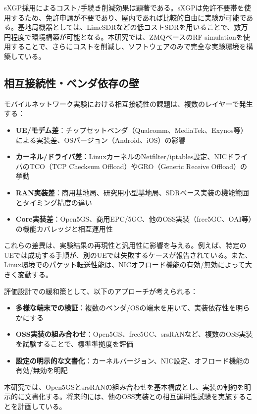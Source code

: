 sXGP採用によるコスト/手続き削減効果は顕著である。sXGPは免許不要帯を使用するため、免許申請が不要であり、屋内であれば比較的自由に実験が可能である。基地局機器としては、LimeSDRなどの低コストSDRを用いることで、数万円程度で環境構築が可能となる。本研究では、ZMQベースのRF simulationを使用することで、さらにコストを削減し、ソフトウェアのみで完全な実験環境を構築している。

\subsection{相互接続性・ベンダ依存の壁}

モバイルネットワーク実験における相互接続性の課題は、複数のレイヤーで発生する：

\begin{itemize}
\item \textbf{UE/モデム差}：チップセットベンダ（Qualcomm、MediaTek、Exynos等）による実装差、OSバージョン（Android、iOS）の影響
\item \textbf{カーネル/ドライバ差}：LinuxカーネルのNetfilter/iptables設定、NICドライバのTCO（TCP Checksum Offload）やGRO（Generic Receive Offload）の挙動
\item \textbf{RAN実装差}：商用基地局、研究用小型基地局、SDRベース実装の機能範囲とタイミング精度の違い
\item \textbf{Core実装差}：Open5GS、商用EPC/5GC、他のOSS実装（free5GC、OAI等）の機能カバレッジと相互運用性
\end{itemize}

これらの差異は、実験結果の再現性と汎用性に影響を与える。例えば、特定のUEでは成功する手順が、別のUEでは失敗するケースが報告されている。また、Linux環境でのパケット転送性能は、NICオフロード機能の有効/無効によって大きく変動する。

評価設計での緩和策として、以下のアプローチが考えられる：

\begin{itemize}
\item \textbf{多様な端末での検証}：複数のベンダ/OSの端末を用いて、実装依存性を明らかにする
\item \textbf{OSS実装の組み合わせ}：Open5GS、free5GC、srsRANなど、複数のOSS実装を試験することで、標準準拠度を評価
\item \textbf{設定の明示的な文書化}：カーネルバージョン、NIC設定、オフロード機能の有効/無効を明記
\end{itemize}

本研究では、Open5GSとsrsRANの組み合わせを基本構成とし、実装の制約を明示的に文書化する。将来的には、他のOSS実装との相互運用性試験を実施することを計画している。

